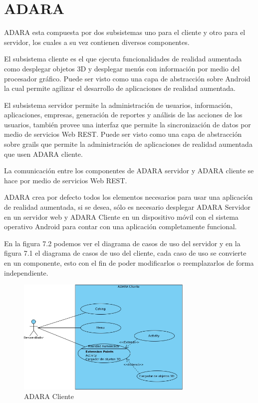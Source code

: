 \documentclass[12pt,a4paper,spanish,openany]{book}
\begin{document}
\section{ADARA}

ADARA esta compuesta por dos subsistemas uno para el cliente y otro para el
servidor, los cuales a su vez contienen diversos componentes.

El subsistema cliente es el que ejecuta funcionalidades de realidad
aumentada como desplegar objetos 3D y desplegar menús con información por medio
del procesador gráfico. Puede ser visto como una capa de abstracción sobre
Android la cual permite agilizar el desarrollo de aplicaciones de realidad
aumentada.

El subsistema servidor permite la administración de usuarios, información,
aplicaciones, empresas, generación de reportes y análisis de las acciones de
los usuarios, también provee una interfaz que permite la sincronización de datos
por medio de servicios Web REST. Puede ser visto como una capa de
abstracción sobre grails que permite la administración de aplicaciones de
realidad aumentada que usen ADARA cliente.


La comunicación entre los componentes de ADARA servidor y
ADARA cliente se hace por medio de servicios Web REST.

ADARA crea por defecto todos los elementos necesarios para usar una aplicación
de realidad aumentada, si se desea, sólo es necesario desplegar ADARA Servidor
en un servidor web  y ADARA Cliente en un dispositivo móvil con el sistema
operativo Android para contar con una aplicación completamente funcional.

En la figura 7.2 podemos ver el diagrama de casos de uso del servidor y en la
figura 7.1 el diagrama de casos de uso del cliente, cada caso de uso se
convierte en un componente, esto con el fin de poder modificarlos o
reemplazarlos de forma independiente.

\begin{figure}[ht]
\begin{center}
 \includegraphics[width=0.75\textwidth]{./img/CUCliente.jpg}
\caption{ADARA Cliente}
\end{center}
\end{figure}
\end{document}
